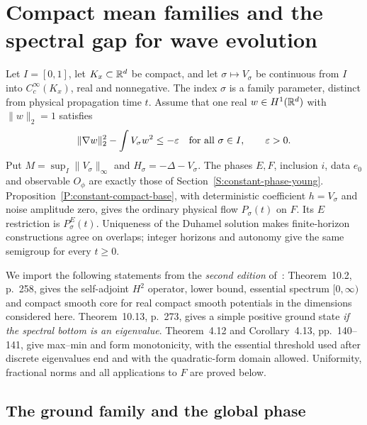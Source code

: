 \section{Compact mean families and the spectral gap for wave evolution}
\label{S:compact-mean-family}

Let $I = [0,1]$, let $K_x \subset \mathbb{R}^d$ be compact, and let $\sigma\mapsto
V_\sigma$ be continuous from $I$ into $C_c^\infty(K_x)$, real and nonnegative.
The index $\sigma$ is a family parameter, distinct from physical propagation
time $t$. Assume that one real $w \in H^1(\mathbb{R}^d)$ with $\|w\|_2 = 1$ satisfies
\begin{equation}\label{E:compact-common-trial}
  \|\nabla w\|_2^2-\int V_\sigma w^2\le-\varepsilon
  \quad\hbox{for all }\sigma\in I,\qquad \varepsilon>0.
\end{equation}
Put $M = \sup_I\|V_\sigma\|_\infty$ and $H_\sigma = -\Delta-V_\sigma$. The
phases $E,F$, inclusion $i$, data $e_0$ and observable $O_\phi$ are exactly
those of Section~\ref{S:constant-phase-young}.
Proposition~\ref{P:constant-compact-base}, with deterministic coefficient $h =
V_\sigma$ and noise amplitude zero, gives the ordinary physical flow
$P_\sigma(t)$ on $F$. Its $E$ restriction is $P_\sigma^E(t)$. Uniqueness of the
Duhamel solution makes finite-horizon constructions agree on overlaps; integer
horizons and autonomy give the same semigroup for every $t \ge 0$.

We import the following statements from the \emph{second edition}
of~\cite{teschl:14:mathematical}: Theorem~10.2, p.~258, gives the self-adjoint
$H^2$ operator, lower bound, essential spectrum $[0,\infty)$ and compact smooth
core for real compact smooth potentials in the dimensions considered here.
Theorem~10.13, p.~273, gives a simple positive ground state \emph{if the
spectral bottom is an eigenvalue}. Theorem~4.12 and Corollary~4.13,
pp.~140--141, give max--min and form monotonicity, with the essential threshold
used after discrete eigenvalues end and with the quadratic-form domain allowed.
Uniformity, fractional norms and all applications to $F$ are proved below.

\subsection{The ground family and the global phase}

